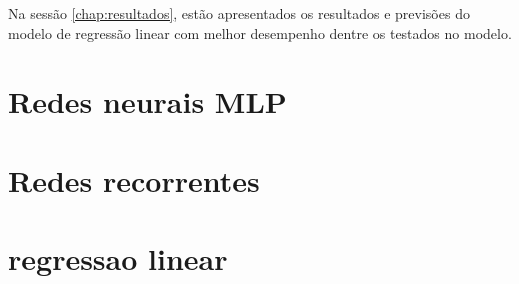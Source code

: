 Na sessão \ref{chap:resultados}, estão apresentados os 
resultados e previsões do modelo de regressão linear com
melhor desempenho dentre os testados no modelo.


\section{Redes neurais MLP}
\section{Redes recorrentes}
\section{regressao linear}